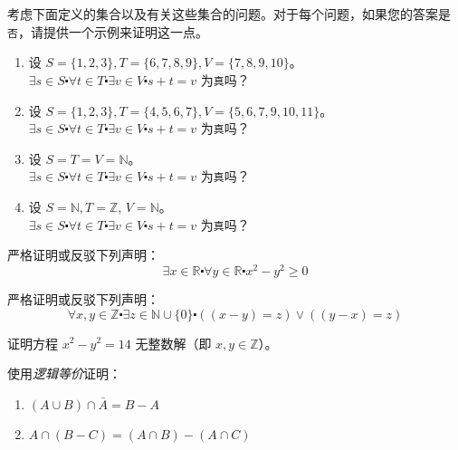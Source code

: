 \begin{exercise}
    考虑下面定义的集合以及有关这些集合的问题。对于每个问题，如果您的答案是\verb|否|，请提供一个示例来证明这一点。

    \begin{enumerate}[label=(\alph*)]
        \item 设 $S = \{1, 2, 3\}, T = \{6, 7, 8, 9\}, V = \{7, 8, 9, 10\}$。\\
            $\exists s \in S \centerdot \forall t \in T \centerdot \exists v \in V \centerdot s + t = v$ 为\verb|真|吗？
        \item 设 $S = \{1, 2, 3\}, T = \{4, 5, 6, 7\}, V = \{5, 6, 7, 9, 10, 11\}$。\\
            $\exists s \in S \centerdot \forall t \in T \centerdot \exists v \in V \centerdot s + t = v$ 为\verb|真|吗？
        \item 设 $S = T = V = \mathbb{N}$。\\
            $\exists s \in S \centerdot \forall t \in T \centerdot \exists v \in V \centerdot s + t = v$ 为\verb|真|吗？
        \item 设 $S = \mathbb{N}, T = \mathbb{Z}$, $V = \mathbb{N}$。\\
            $\exists s \in S \centerdot \forall t \in T \centerdot \exists v \in V \centerdot s + t = v$ 为\verb|真|吗？
    \end{enumerate}  
\end{exercise}

\begin{exercise}
    严格证明或反驳下列声明：
    \[\exists x \in \mathbb{R} \centerdot \forall y \in \mathbb{R} \centerdot x^2 - y^2 \ge 0\]
\end{exercise}

\begin{exercise}
    严格证明或反驳下列声明：
    \[\forall x, y \in \mathbb{Z} \centerdot \exists z \in \mathbb{N} \cup \{0\} \centerdot ((x - y) = z) \lor ((y - x) = z)\]
\end{exercise}

\begin{exercise}
    证明方程 $x^2-y^2=14$ 无整数解（即 $x, y \in \mathbb{Z}$）。
\end{exercise}

\begin{exercise}
    使用\emph{逻辑等价}证明：

    \begin{enumerate}[label=(\alph*)]
        \item $(A \cup B) \cap \bar{A} = B - A$
        \item $A \cap (B - C) = (A \cap B) - (A \cap C)$
    \end{enumerate}  
\end{exercise}

